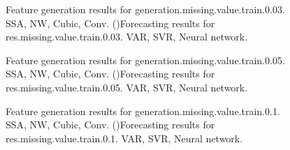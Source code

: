 \documentclass[12pt]{article}
\begin{document}
\begin{figure}
\centering
{}
\caption{Feature generation results for	generation.missing.value.train.0.03.	SSA, NW, Cubic, Conv. ()Forecasting results for	res.missing.value.train.0.03.	VAR, SVR, Neural network.}
\end{figure}


\begin{figure}
\centering
{}
\caption{Feature generation results for	generation.missing.value.train.0.05.	SSA, NW, Cubic, Conv. ()Forecasting results for	res.missing.value.train.0.05.	VAR, SVR, Neural network.}
\end{figure}


\begin{figure}
\centering
{}
\caption{Feature generation results for	generation.missing.value.train.0.1.	SSA, NW, Cubic, Conv. ()Forecasting results for	res.missing.value.train.0.1.	VAR, SVR, Neural network.}
\end{figure}
\end{document}
